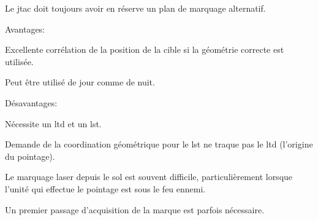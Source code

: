 \begin{e1}
\begin{e2}
\begin{e3}
			\item Le \gls{jtac} doit toujours avoir en réserve un plan de marquage alternatif.
		\end{e3}
		
		
		\begin{e3}
			
			
			\begin{e4}
				\item Avantages:
				\begin{e5}
					\item Excellente corrélation de la position de la cible si la géométrie correcte est utilisée.
					\item Peut être utilisé de jour comme de nuit.
				\end{e5}
				\item Désavantages:
				\begin{e5}
						\item Nécessite un \gls{ltd} et un \gls{lst}.
						\item Demande de la coordination géométrique pour le \gls{lst} ne traque pas le \gls{ltd} (l'origine du pointage).
						\item Le marquage laser depuis le sol est souvent difficile, particulièrement lorsque l'unité qui effectue le pointage est sous le feu ennemi.
						\item Un premier passage d'acquisition de la marque est parfois nécessaire.
				\end{e5}
			\end{e4}
			



\end{e3}
\end{e2}
\end{e1}
